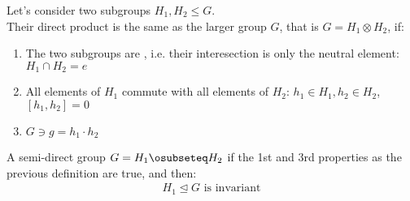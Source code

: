 \documentclass[../Theoretical.tex]{subfiles}
\begin{document}
Let's consider two subgroups $H_1, H_2 \leq G$.\\ Their direct product is the same as the larger group $G$, that is $G=H_1\otimes H_2$, if:
\begin{enumerate}
\item The two subgroups are , i.e. their interesection is only the neutral element:$H_1 \cap H_2 = e$
\item All elements of $H_1$ commute with all elements of $H_2$: $h_1 \in H_1, h_2 \in H_2$, $[h_1, h_2] = 0$
\item $G \ni g = h_1 \cdot h_2$
\end{enumerate}

\begin{dfn}
A semi-direct group $G=H_1 \osubseteq H_2$ if the 1st and 3rd properties as the previous definition are true, and then:
\begin{align*}
H_1 \trianglelefteq G \text{ is invariant}
\end{align*}
\end{dfn}
\end{document}
